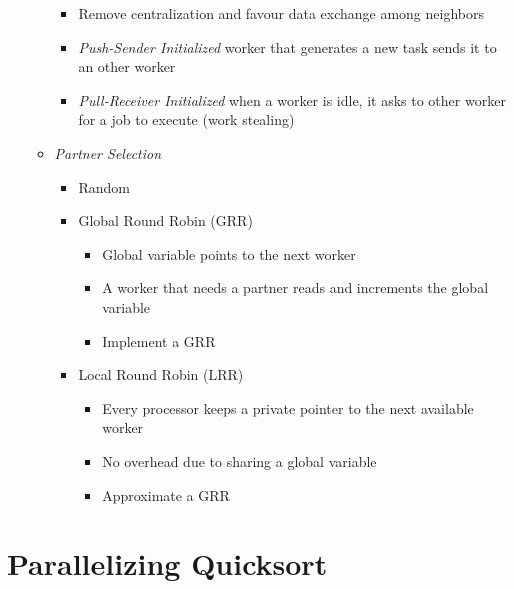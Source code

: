 \documentclass[12pt,oneside]{report}
\begin{document}
\begin{itemize}
\begin{itemize}
        \begin{itemize}
            \item Remove centralization and favour data exchange among neighbors
            \item \textit{Push-Sender Initialized} worker that generates a new task sends it to an other worker
            \item \textit{Pull-Receiver Initialized} when a worker is idle, it asks to other worker for a job to execute (work stealing)
        \end{itemize}
        \item \textit{Partner Selection}
        \begin{itemize}
            \item Random
            \item Global Round Robin (GRR)
            \begin{itemize}
                \item Global variable points to the next worker
                \item A worker that needs a partner reads and increments the global variable
                \item Implement a GRR
            \end{itemize}
            \item Local Round Robin (LRR)
            \begin{itemize}
                \item Every processor keeps a private pointer to the next available worker
                \item No overhead due to sharing a global variable
                \item Approximate a GRR
            \end{itemize}
        \end{itemize}
    \end{itemize}
\end{itemize}

\section{Parallelizing Quicksort}
\end{document}
